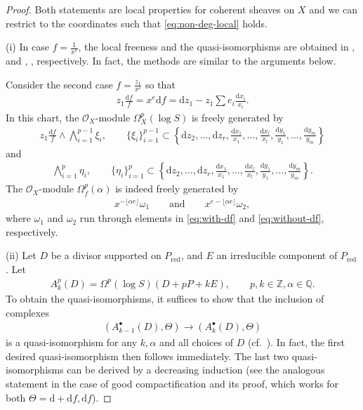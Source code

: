 \documentclass[11pt]{article}
\newcommand{\QQ}{\mathbb{Q}}
\newcommand{\ZZ}{\mathbb{Z}}
\newcommand{\sO}{\mathscr{O}}
\newcommand{\de}{\mathrm{d}}
\newcommand{\ddRH}{\Theta}
\newcommand{\cpt}{compactification}
\newcommand{\flr}[1]{\lfloor #1 \rfloor}
\newcommand{\red}[1]{{#1}_{\mathrm{red}}}
\begin{document}
\begin{proof} Both statements are local properties for coherent sheaves on $X$ and we can restrict to the coordinates such that \eqref{eq:non-deg-local} holds.

(i) In case $f = \frac{1}{x^e}$, the local freeness and the quasi-isomorphisms are obtained in \cite[equation~(1.3.1)]{ESY}, \cite[Lemma 2.12(a)]{KKP} and \cite[Proposition~1.3.]{Y}, \cite[Proposition~1.4.2]{ESY},
respectively. In fact, the methods are similar to the arguments below.

Consider the second case $f = \frac{z_1}{x^e}$ so that
\begin{gather*} z_1\frac{\de f}{f} = x^e\de f = \de z_1 - z_1\sum e_i\frac{\de x_i}{x_i}. \end{gather*}
In this chart,
the $\sO_X$-module $\Omega_X^p(\log S)$ is freely generated by
\begin{gather}\label{eq:with-df}
z_1\frac{\de f}{f}\wedge\bigwedge_{i=1}^{p-1}\xi_i, \qquad \{\xi_i \}_{i=1}^{p-1} \subset \left\{ \de z_2,\dots, \de z_r,\frac{\de x_1}{x_1},\dots, \frac{\de x_l}{x_l},\frac{\de y_1}{y_1},\dots, \frac{\de y_m}{y_m} \right\}
\end{gather}
and
\begin{gather}\label{eq:without-df}
\bigwedge_{i=1}^p\eta_i, \qquad \{\eta_i \}_{i=1}^p \subset \left\{ \de z_2,\dots, \de z_r, \frac{\de x_1}{x_1},\dots, \frac{\de x_l}{x_l},\frac{\de y_1}{y_1},\dots, \frac{\de y_m}{y_m} \right\}.
\end{gather}
The $\sO_X$-module $\Omega_f^p(\alpha)$ is indeed freely generated by
\begin{gather}\label{eq:Kont-loc-gen}
x^{-\flr{\alpha e}}\omega_1 \qquad\text{and}\qquad x^{e-\flr{\alpha e}}\omega_2,
\end{gather}
where $\omega_1$ and $\omega_2$ run through elements in \eqref{eq:with-df} and \eqref{eq:without-df}, respectively.

(ii) Let $D$ be a divisor supported on $\red{P}$, and $E$ an irreducible component of $\red{P}$. Let
\begin{gather*} A^p_k(D) = \Omega^p(\log S)(D +pP + kE), \qquad p,k\in\ZZ, \alpha\in\QQ. \end{gather*}
To obtain the quasi-isomorphisms, it suffices to show that the inclusion of complexes
\begin{gather}\label{eq:extended}
(A_{k-1}^\bullet(D), \ddRH) \to (A_k^\bullet(D), \ddRH)
\end{gather}
is a quasi-isomorphism for any $k,\alpha$ and all choices of $D$ (cf.~\cite[Proposition~1.2]{Y}). In fact, the first desired quasi-isomorphism then follows immediately. The last two quasi-isomorphisms can be derived by a decreasing induction (see the analogous statement \cite[Proposition~1.4.2]{ESY} in the case of good {\cpt} and its proof, which works for both $\ddRH = \de+\de f, \de f$).


\end{proof}
\end{document}
